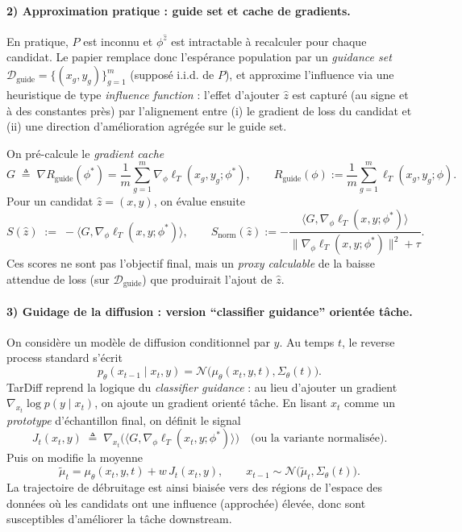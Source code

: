 \documentclass[11pt]{article}
\begin{document}
\paragraph{2) Approximation pratique : guide set et cache de gradients.}
En pratique, $P$ est inconnu et $\phi^{\hat z}$ est intractable à recalculer pour chaque candidat.
Le papier remplace donc l'espérance population par un \emph{guidance set}
$\mathcal D_{\text{guide}}=\{(x_g,y_g)\}_{g=1}^m$ (supposé i.i.d. de $P$), et approxime l'influence via une heuristique de type \emph{influence function} : l'effet d'ajouter $\hat z$ est capturé (au signe et à des constantes près) par l'alignement entre (i) le gradient de loss du candidat et (ii) une direction d'amélioration agrégée sur le guide set.

On pré-calcule le \emph{gradient cache}
\[
G\;\triangleq\;\nabla R_{\text{guide}}(\phi^*)
=\frac{1}{m}\sum_{g=1}^m\nabla_\phi\ell_T(x_g,y_g;\phi^*),
\qquad
R_{\text{guide}}(\phi):=\frac{1}{m}\sum_{g=1}^m\ell_T(x_g,y_g;\phi).
\]
Pour un candidat $\hat z=(x,y)$, on évalue ensuite
\[
S(\hat z)\;:=\;-\langle G,\nabla_\phi\ell_T(x,y;\phi^*)\rangle,
\qquad
S_{\text{norm}}(\hat z):=-\frac{\langle G,\nabla_\phi\ell_T(x,y;\phi^*)\rangle}{\|\nabla_\phi\ell_T(x,y;\phi^*)\|^2+\tau}.
\]
Ces scores ne sont pas l'objectif final, mais un \emph{proxy calculable} de la baisse attendue de loss (sur $\mathcal D_{\text{guide}}$) que produirait l'ajout de $\hat z$.

\paragraph{3) Guidage de la diffusion : version ``classifier guidance'' orientée tâche.}
On considère un modèle de diffusion conditionnel par $y$.
Au temps $t$, le reverse process standard s'écrit
\[
 p_\theta(x_{t-1}\mid x_t,y)=\mathcal N\big(\mu_\theta(x_t,y,t),\Sigma_\theta(t)\big).
\]
TarDiff reprend la logique du \emph{classifier guidance} : au lieu d'ajouter un gradient $\nabla_{x_t}\log p(y\mid x_t)$, on ajoute un gradient orienté tâche.
En lisant $x_t$ comme un \emph{prototype} d'échantillon final, on définit le signal
\[
J_t(x_t,y)
\;\triangleq\;
\nabla_{x_t}\Big(\langle G,\nabla_\phi\ell_T(x_t,y;\phi^*)\rangle\Big)
\quad \text{(ou la variante normalisée).}
\]
Puis on modifie la moyenne
\[
\widetilde\mu_t=\mu_\theta(x_t,y,t)+w\,J_t(x_t,y),
\qquad
x_{t-1}\sim\mathcal N\big(\widetilde\mu_t,\Sigma_\theta(t)\big).
\]
La trajectoire de débruitage est ainsi biaisée vers des régions de l'espace des données où les candidats ont une influence (approchée) élevée, donc sont susceptibles d'améliorer la tâche downstream.
\end{document}
